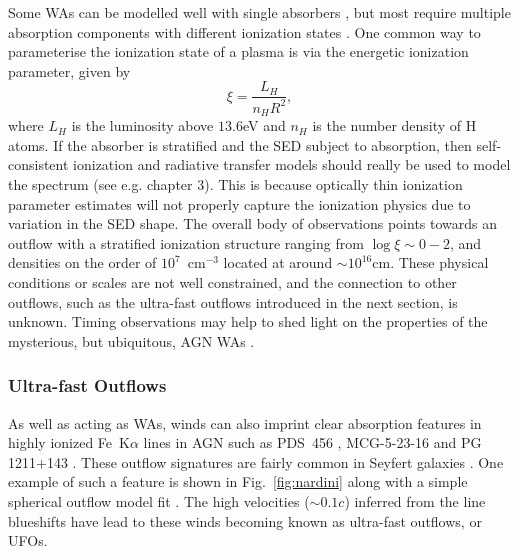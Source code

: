 Some WAs can be modelled well with single absorbers \citep{kaastra2000}, 
but most require multiple absorption components with different ionization states
\citep[e.g.][]{kriss1996,orr1997,krolikkriss2001,connolly2014}.
One common way to parameterise the ionization state of a plasma is 
via the energetic ionization parameter, given by \citep[e.g.]{reynolds1995}
\begin{equation}
\xi = \frac{L_{H}}{n_H R^2},
\end{equation}
where $L_H$ is the luminosity above $13.6$eV and $n_H$ is the number
density of H atoms. If the absorber is stratified and the SED subject to absorption, 
then self-consistent ionization and radiative transfer models
should really be used to model the spectrum (see e.g. chapter 3). This is 
because optically thin ionization parameter estimates will not properly capture 
the ionization physics due to variation in the SED shape.
The overall body of observations points towards an outflow with a 
stratified ionization structure ranging from $\log \xi \sim 0-2$, 
and densities on the order of $10^7$~cm$^{-3}$ located at around $\sim10^{16}$cm. 
These physical conditions or scales are not well constrained, and the connection to 
other outflows, such as the ultra-fast outflows introduced in the next section, 
is unknown. Timing observations may help to shed light on 
the properties of the mysterious, but ubiquitous, 
AGN WAs \citep{silva2015}.

\subsubsection{Ultra-fast Outflows}
\label{sec:ufos}

As well as acting as WAs, winds can also imprint clear absorption features
in highly ionized Fe~K$\alpha$ lines in AGN such as PDS~456 
\citep{reeves2003, gofford2014,matzeu2016},
MCG-5-23-16 \citep{braito2007} and PG 1211+143 \citep{poundsreeves2009,fukumura2015}.
These outflow signatures are fairly common in Seyfert galaxies \citep{tombesi2010a, gofford2013}. 
One example of such a feature is shown in 
Fig.~\ref{fig:nardini} along with a simple spherical outflow model fit 
\citep{nardini2015}. The high velocities ($\sim0.1c$) inferred 
from the line blueshifts have lead to these winds becoming known as 
ultra-fast outflows, or UFOs. 

